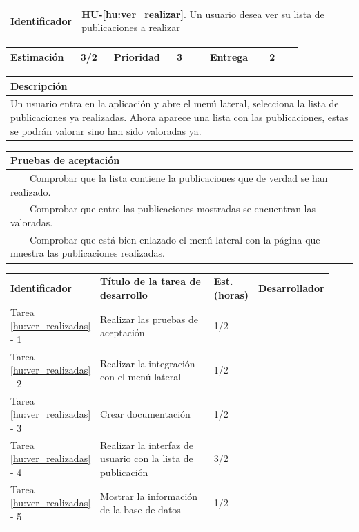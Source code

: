 \documentclass[11pt]{article}
\newcommand{\tabitem}{~~\llap{\textbullet}~~}
\begin{document}
\begin{longtable}{p{0.18\linewidth}|p{0.8\linewidth}}
  \rowcolor{Orange}
  \textbf{Identificador} & \textbf{HU-\ref{hu:ver_realizar}}. Un usuario desea ver su lista de publicaciones a realizar \\  
\end{longtable}
\vspace{-0.8cm}
\begin{longtable}{p{0.18\linewidth}|p{0.1\linewidth}|p{0.18\linewidth}|p{0.1\linewidth}|p{0.18\linewidth}|p{0.1\linewidth}}
  \toprule
  \textbf{Estimación} & 3/2 & \textbf{Prioridad} & 3 & \textbf{Entrega} & 2 \\
  \bottomrule
\end{longtable}
\vspace{-0.8cm}
\begin{longtable}{p{1.028\linewidth}}
  \textbf{Descripción}\\
  \midrule
  Un usuario entra en la aplicación y abre el menú lateral, selecciona la lista de publicaciones ya realizadas. Ahora aparece una lista con las publicaciones, estas se podrán valorar sino han sido valoradas ya. \\
  \bottomrule
\end{longtable}
\vspace{-0.8cm}
\begin{longtable}{p{1.028\linewidth}}
  \textbf{Pruebas de aceptación}\\
  \midrule
  \tabitem Comprobar que la lista contiene la publicaciones que de verdad se han realizado.\\
  \tabitem Comprobar que entre las publicaciones mostradas se encuentran las valoradas.\\
  \tabitem Comprobar que está bien enlazado el menú lateral con la página que muestra las publicaciones realizadas.\\
\end{longtable}
\vspace{-0.8cm}
\begin{longtable}{p{0.18\linewidth}|p{0.48\linewidth}|p{0.1\linewidth}|p{0.17\linewidth}}
  \toprule
  \textbf{Identificador} & \textbf{Título de la tarea de desarrollo} & \textbf{Est. (horas)} & \textbf{Desarrollador} \\
  Tarea \ref{hu:ver_realizadas} - 1 & Realizar las pruebas de aceptación & 1/2 &\\
  Tarea \ref{hu:ver_realizadas} - 2 & Realizar la integración con el menú lateral & 1/2 & \\
  Tarea \ref{hu:ver_realizadas} - 3 & Crear documentación & 1/2 & \\
  Tarea \ref{hu:ver_realizadas} - 4 & Realizar la interfaz de usuario con la lista de publicación & 3/2 &  \\
  Tarea \ref{hu:ver_realizadas} - 5 & Mostrar la información de la base de datos & 1/2 &  \\
  \bottomrule
\end{longtable}
\end{document}
